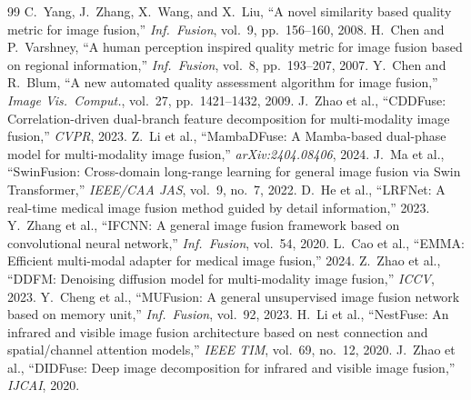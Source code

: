 \documentclass[a4paper,12pt]{article}
\begin{document}
\begin{thebibliography}{99}
 C.~Yang, J.~Zhang, X.~Wang, and X.~Liu, ``A novel similarity based quality metric for image fusion,'' \textit{Inf.\ Fusion}, vol.~9, pp.~156--160, 2008.
 H.~Chen and P.~Varshney, ``A human perception inspired quality metric for image fusion based on regional information,'' \textit{Inf.\ Fusion}, vol.~8, pp.~193--207, 2007.
 Y.~Chen and R.~Blum, ``A new automated quality assessment algorithm for image fusion,'' \textit{Image Vis.\ Comput.}, vol.~27, pp.~1421--1432, 2009.
 J.~Zhao et al., ``CDDFuse: Correlation-driven dual-branch feature decomposition for multi-modality image fusion,'' \textit{CVPR}, 2023.
 Z.~Li et al., ``MambaDFuse: A Mamba-based dual-phase model for multi-modality image fusion,'' \textit{arXiv:2404.08406}, 2024.
 J.~Ma et al., ``SwinFusion: Cross-domain long-range learning for general image fusion via Swin Transformer,'' \textit{IEEE/CAA JAS}, vol.~9, no.~7, 2022.
 D.~He et al., ``LRFNet: A real-time medical image fusion method guided by detail information,'' 2023.
 Y.~Zhang et al., ``IFCNN: A general image fusion framework based on convolutional neural network,'' \textit{Inf.\ Fusion}, vol.~54, 2020.
 L.~Cao et al., ``EMMA: Efficient multi-modal adapter for medical image fusion,'' 2024.
 Z.~Zhao et al., ``DDFM: Denoising diffusion model for multi-modality image fusion,'' \textit{ICCV}, 2023.
 Y.~Cheng et al., ``MUFusion: A general unsupervised image fusion network based on memory unit,'' \textit{Inf.\ Fusion}, vol.~92, 2023.
 H.~Li et al., ``NestFuse: An infrared and visible image fusion architecture based on nest connection and spatial/channel attention models,'' \textit{IEEE TIM}, vol.~69, no.~12, 2020.
 J.~Zhao et al., ``DIDFuse: Deep image decomposition for infrared and visible image fusion,'' \textit{IJCAI}, 2020.
\end{thebibliography}
\end{document}
